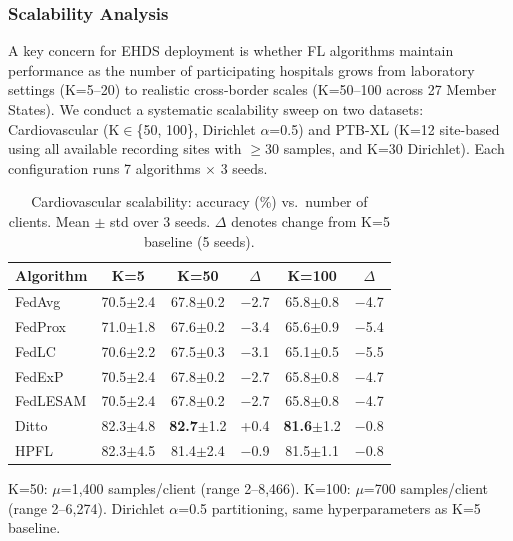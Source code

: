 \documentclass[conference]{IEEEtran}
\begin{document}
\subsubsection{Scalability Analysis}
\label{sec:scalability}

A key concern for EHDS deployment is whether FL algorithms maintain performance as the number of participating hospitals grows from laboratory settings (K=5--20) to realistic cross-border scales (K=50--100 across 27 Member States). We conduct a systematic scalability sweep on two datasets: Cardiovascular (K$\in$\{50, 100\}, Dirichlet $\alpha$=0.5) and PTB-XL (K=12 site-based using all available recording sites with $\geq$30 samples, and K=30 Dirichlet). Each configuration runs 7 algorithms $\times$ 3 seeds.

\begin{table}[htbp]
\centering
\caption{Cardiovascular scalability: accuracy (\%) vs.\ number of clients. Mean $\pm$ std over 3 seeds. $\Delta$ denotes change from K=5 baseline (5 seeds).}
\label{tab:cv_scalability}
\small
\begin{tabular}{lccccc}
\toprule
\textbf{Algorithm} & \textbf{K=5} & \textbf{K=50} & \textbf{$\Delta$} & \textbf{K=100} & \textbf{$\Delta$} \\
\midrule
FedAvg & 70.5{\tiny$\pm$2.4} & 67.8{\tiny$\pm$0.2} & $-$2.7 & 65.8{\tiny$\pm$0.8} & $-$4.7 \\
FedProx & 71.0{\tiny$\pm$1.8} & 67.6{\tiny$\pm$0.2} & $-$3.4 & 65.6{\tiny$\pm$0.9} & $-$5.4 \\
FedLC & 70.6{\tiny$\pm$2.2} & 67.5{\tiny$\pm$0.3} & $-$3.1 & 65.1{\tiny$\pm$0.5} & $-$5.5 \\
FedExP & 70.5{\tiny$\pm$2.4} & 67.8{\tiny$\pm$0.2} & $-$2.7 & 65.8{\tiny$\pm$0.8} & $-$4.7 \\
FedLESAM & 70.5{\tiny$\pm$2.4} & 67.8{\tiny$\pm$0.2} & $-$2.7 & 65.8{\tiny$\pm$0.8} & $-$4.7 \\
\midrule
Ditto & 82.3{\tiny$\pm$4.8} & \textbf{82.7}{\tiny$\pm$1.2} & +0.4 & \textbf{81.6}{\tiny$\pm$1.2} & $-$0.8 \\
HPFL & 82.3{\tiny$\pm$4.5} & 81.4{\tiny$\pm$2.4} & $-$0.9 & 81.5{\tiny$\pm$1.1} & $-$0.8 \\
\bottomrule
\end{tabular}

\vspace{1mm}
\footnotesize{K=50: $\mu$=1,400 samples/client (range 2--8,466). K=100: $\mu$=700 samples/client (range 2--6,274). Dirichlet $\alpha$=0.5 partitioning, same hyperparameters as K=5 baseline.}
\end{table}
\end{document}
